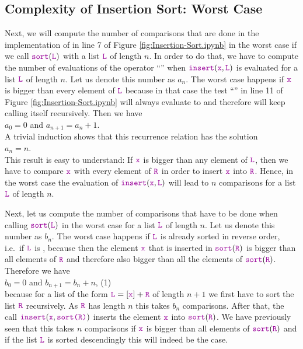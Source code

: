 \subsection{Complexity of Insertion Sort: Worst Case}
Next, we will compute the number of comparisons that are done in the implementation of 
in line 7 of Figure \ref{fig:Insertion-Sort.ipynb} in the worst case if we call $\mytt{sort}(\mytt{L})$ with a list
$\mytt{L}$ of length $n$. In order to do that, 
we have to compute the number of evaluations of the operator ``\mytt{<=}'' when 
 $\mytt{insert}(\mytt{x},\mytt{L})$ is evaluated for a list $\mytt{L}$ of length $n$.  Let us denote this number as 
$a_n$.  The worst case happens if $\mytt{x}$ is bigger than every element of $\mytt{L}$ because in that case the
test ``'' in line 11 of Figure \ref{fig:Insertion-Sort.ipynb} will always evaluate to
 and therefore  will keep calling itself recursively.
Then we have
\\[0.2cm]
\hspace*{1.3cm}
$a_0 = 0$ \quad and \quad $a_{n+1} = a_n + 1$. 
\\[0.2cm]
A trivial induction shows that this recurrence relation has the solution
\\[0.2cm]
\hspace*{1.3cm} 
$a_n = n$.
\\[0.2cm]
This result is easy to understand:  If $\mytt{x}$ is bigger than any element of $\mytt{L}$, then we have to
compare $\mytt{x}$ with every element of $\mytt{R}$ in order to insert $\mytt{x}$ into $\mytt{R}$.
Hence, in the worst case the evaluation of $\mytt{insert}(\mytt{x},\mytt{L})$ will lead to $n$ comparisons for a list $\mytt{L}$ of length $n$.

Next, let us compute the number of comparisons that have to be done when calling
$\mytt{sort}(\mytt{L})$ in the worst case for a list  $\mytt{L}$ of length $n$.  Let us denote this number as
$b_n$. The worst case happens if $\mytt{L}$ is already sorted in reverse order, i.e.~if $\mytt{L}$ is
, because then the element $\mytt{x}$ that is inserted in
$\mytt{sort}(\mytt{R})$ is bigger than all elements 
of $\mytt{R}$ and therefore also bigger than all the elements of $\mytt{sort}(\mytt{R})$.  Therefore we have \\[0.2cm]
\hspace*{1.3cm}
 $b_0 = 0$ \quad and \quad $b_{n+1} = b_n + n$, \hspace*{\fill} (1)
\\[0.2cm]
because for a list of the form $\mytt{L} = [\mytt{x}] + \mytt{R}$ of length $n+1$ we first have to sort the list $\mytt{R}$
recursively.  As $\mytt{R}$ has length $n$ this takes $b_n$ comparisons.  After that, the call
$\mytt{insert}(\mytt{x}, \mytt{sort(\mytt{R})})$ 
inserts the element $\mytt{x}$ into $\mytt{sort}(\mytt{R})$.  We have previously seen that this takes $n$
comparisons if $\mytt{x}$ is bigger than all elements of $\mytt{sort}(\mytt{R})$ and if the list $\mytt{L}$ is sorted
descendingly this will indeed be the case.

